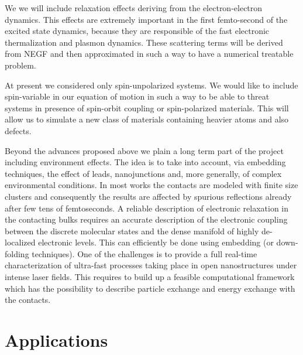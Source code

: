 We we will include relaxation effects deriving from the electron-electron dynamics. This effects are extremely important in the first femto-second of the excited state dynamics, because they are responsible of the fast electronic thermalization and plasmon dynamics. These scattering terms will be derived from NEGF and then approximated in such a way to have a numerical treatable problem.

At present we considered only spin-unpolarized systems. We would like to include spin-variable in our equation of motion in such a way to be able to threat systems in presence of spin-orbit coupling or spin-polarized materials. This will allow us to simulate a new class of materials containing heavier atoms and also defects. 


Beyond the advances proposed above we plain a long term part of the project including environment effects.
The idea is to take into account, via embedding techniques, the effect of leads,  nanojunctions and, more generally, of complex environmental conditions. In most works the contacts are modeled with finite size clusters and consequently the results are affected by spurious reflections already after few tens of femtoseconds. A reliable description of electronic relaxation in the contacting bulks requires an accurate description of the electronic coupling between the discrete molecular states and the dense manifold of highly de-localized electronic levels. This can efficiently be done using embedding (or down-folding techniques). One of the challenges  is to provide a full real-time characterization of ultra-fast processes taking place in open nanostructures under intense laser fields. This requires to build up a feasible computational framework which has the possibility to describe particle exchange and energy exchange with the contacts.

\section{Applications}

